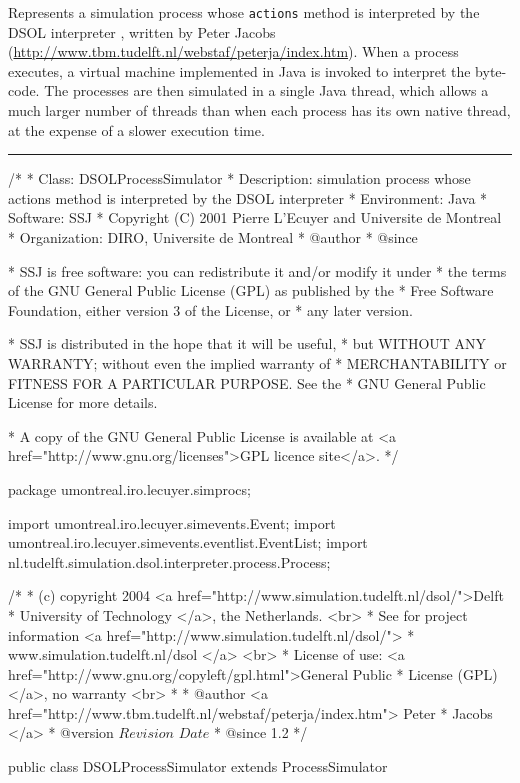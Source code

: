 
Represents a simulation process whose \texttt{actions} method is
interpreted by the DSOL interpreter \cite{iJAC05a}, written by
Peter Jacobs (\url{http://www.tbm.tudelft.nl/webstaf/peterja/index.htm}).
When a process executes, a virtual machine
implemented in Java is invoked to interpret the byte-code.
The processes are then simulated in a single Java thread, which allows
a much larger number of threads than when each process has its own
native thread, at the expense of a slower execution time.


\bigskip\hrule

\begin{code}
\begin{hide}
/*
 * Class:        DSOLProcessSimulator
 * Description:  simulation process whose actions method is interpreted by
                 the DSOL interpreter
 * Environment:  Java
 * Software:     SSJ 
 * Copyright (C) 2001  Pierre L'Ecuyer and Universite de Montreal
 * Organization: DIRO, Universite de Montreal
 * @author       
 * @since

 * SSJ is free software: you can redistribute it and/or modify it under
 * the terms of the GNU General Public License (GPL) as published by the
 * Free Software Foundation, either version 3 of the License, or
 * any later version.

 * SSJ is distributed in the hope that it will be useful,
 * but WITHOUT ANY WARRANTY; without even the implied warranty of
 * MERCHANTABILITY or FITNESS FOR A PARTICULAR PURPOSE.  See the
 * GNU General Public License for more details.

 * A copy of the GNU General Public License is available at
   <a href="http://www.gnu.org/licenses">GPL licence site</a>.
 */
\end{hide}
package umontreal.iro.lecuyer.simprocs;\begin{hide}

import umontreal.iro.lecuyer.simevents.Event;
import umontreal.iro.lecuyer.simevents.eventlist.EventList;
import nl.tudelft.simulation.dsol.interpreter.process.Process;

/*
 * (c) copyright 2004 <a href="http://www.simulation.tudelft.nl/dsol/">Delft
 * University of Technology </a>, the Netherlands. <br>
 * See for project information <a href="http://www.simulation.tudelft.nl/dsol/">
 * www.simulation.tudelft.nl/dsol </a> <br>
 * License of use: <a href="http://www.gnu.org/copyleft/gpl.html">General Public
 * License (GPL) </a>, no warranty <br>
 *
 * @author <a href="http://www.tbm.tudelft.nl/webstaf/peterja/index.htm"> Peter
 *         Jacobs </a>
 * @version $Revision$ $Date$
 * @since 1.2
 */ \end{hide}


public class DSOLProcessSimulator extends ProcessSimulator\begin{hide} {
\end{hide}
\end{code}

